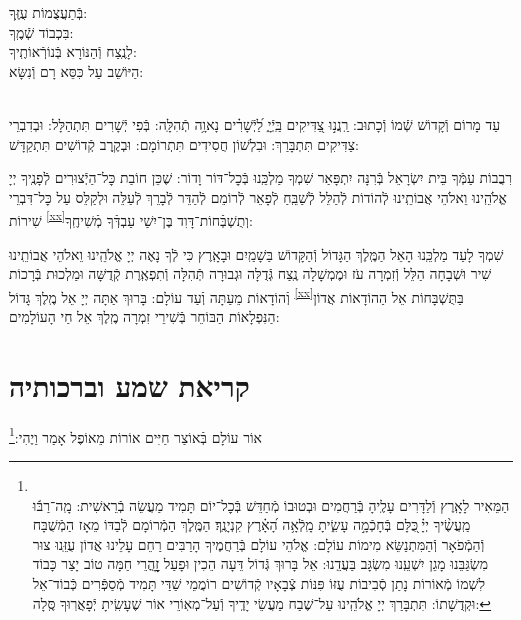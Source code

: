 \documentclass[twoside, openany, parskip=half, 11pt]{book}
\begin{document}

בְּֿתַעֲצֻמוֹת עֻזֶּֽךָ:\\
בִּכְבוֹד שְֿׁמֶֽךָ:\\
לָנֶֽצַח וְֿהַנּוֹרָא בְּֿנוֹרְֿאוֹתֶֽיךָ:\\
הַיּוֹשֵׁב עַל כִּסֵּא רָם וְֿנִשָּׂא:

\\
עַד מָרוֹם וְֿקָדוֹשׁ שְֿׁמוֹ וְֿכָתוּב: רַֽנֲנ֣וּ צַ֭דִּיקִים בַּֽיְֿיָ֑ לַ֝יְֿשָׁרִ֗ים נָאוָ֥ה תְֿהִלָּֽה: בְּֿפִי יְֿשָׁרִים תִּתְהַלָּל: וּבְדִבְרֵי צַדִּיקִים תִּתְבָּרַךְ: וּבִלְשׁוֹן חֲסִידִים תִּתְרוֹמָם: וּבְקֶֽרֶב קְֿדוֹשִׁים תִּתְקַדָּשׁ:

רִבֲבוֹת עַמְּֿךָ בֵּית יִשְׂרָאֵל בְּֿרִנָּה יִתְפָּאַר שִׁמְךָ מַלְכֵּֽנוּ בְּֿכׇל־דּוֹר וָדוֹר: שֶׁכֵּן חוֹבַת כׇּל־הַיְֿצוּרִים לְֿפָנֶֽיךָ יְיָ אֱלֹהֵֽינוּ וֵאלֹהֵי אֲבוֹתֵֽינוּ לְֿהוֹדוֹת לְֿהַלֵּל לְֿשַׁבֵּֽחַ לְֿפָאֵר לְֿרוֹמֵם לְֿהַדֵּר לְֿבָרֵךְ לְֿעַלֵּה וּלְקַלֵּס עַל כׇּל־דִּבְרֵי שִׁירוֹת \textsuperscript{\ref{xx}}וְתֻשְׁבְּֿחוֹת־דָּוִד בֶּן־יִשַׁי עַבְדְּֿךָ מְֿשִׁיחֶֽךָ:


שִׁמְךָ לָעַד מַלְכֵּֽנוּ הָאֵל הַמֶּֽלֶךְ הַגָּדוֹל וְֿהַקָּדוֹשׁ בַּשָׁמַֽיִם וּבָאָֽרֶץ כִּי לְֿךָ נָאֶה יְיָ אֱלֹהֵֽינוּ וֵאלֹהֵי אֲבוֹתֵֽינוּ שִׁיר וּשְׁבָחָה הַלֵּל וְֿזִמְרָה עֹז וּמֶמְשָׁלָה נֶֽצַח גְּֿדֻלָּה וּגְבוּרָה תְּֿהִלָּה וְֿתִפְאֶֽרֶת קְֿדֻשָּׁה וּמַלְכוּת בְּֿרָכוֹת וְֿהוֹדָאוֹת מֵעַתָּה וְֿעַד עוֹלָם:
בָּרוּךְ אַתָּה יְיָ אֵל מֶֽלֶךְ גָּדוֹל \textsuperscript{\ref{xx}}בַּתֻּשְׁבָּחוֹת אֵל הַהוֹדָאוֹת אֲדוֹן הַנִּפְלָאוֹת הַבּוֹחֵר בְּֿשִׁירֵי זִמְרָה מֶֽלֶךְ אֵל חַי הָעוֹלָמִים:

\halfkaddish

\section*{ קריאת שמע וברכותיה }

\barachu


אוֹר עוֹלָם בְּֿאוֹצַר חַיִּים אוֹרוֹת מֵאוֹפֶל אָמַר וַיֶהִי:\footnote{\\
הַמֵּאִיר לָאָֽרֶץ וְֿלַדָּרִים עָלֶֽיהָ בְּֿרַחֲמִים וּבְטוּבוֹ מְֿחַדֵּשׁ בְּֿכׇל־יוֹם תָּמִיד מַעֲשֵׂה בְֿרֵאשִׁית:
מָֽה־רַבּ֬וּ מַֽעֲשֶׂ֨יךָ יְיָ֗ ֖כֻּלָּם בְּֿחָכְֿמָ֣ה עָשִׂ֑יתָ מָֽלְֿאָ֥ה הָ֝אָ֗רֶץ קִנְיָנֶֽךָ׃ הַמֶּֽלֶךְ הַמְֿרוֹמָם לְֿבַדּוֹ מֵאָז הַמְֿשֻׁבָּח וְֿהַמְֿפֹאָר וְֿהַמִּתְנַשֵּׂא מִימוֹת עוֹלָם: אֱלֹהֵי עוֹלָם בְּֿרַחֲמֶיךָ הָרַבִּים רַחֵם עָלֵינוּ אֲדוֹן עֻזֵּֽנוּ צוּר מִשְׂגַּבֵּנוּ מָגֵן יִשְׁעֵֽנוּ מִשְׂגָּב בַּעֲדֵֽנוּ: אֵל בָּרוּךְ גְּֿדוֹל דֵּעָה הֵכִין וּפָעַל זׇׇׇׇָהֳרֵי חַמָּה טוֹב יָצַר כָּבוֹד לִשְׁמוֹ מְֿאוֹרוֹת נָתַן סְֿבִיבוֹת עֻזּוֹ פִּנּוֹת צְֿבָאָיו קְֿדוֹשִׁים רוֹמֲמֵי שַׁדַּי תָּמִיד מְֿסַפְּֿרִים כְּֿבוֹד־אֵל וּקְדֻשָׁתוֹ: תִּתְבָּרַךְ יְיָ אֱלֹהֵֽינוּ עַל־שֶׁבַח מַעֲשֵׂי יָדֶֽיךָ וְֿעַל־מְאֽוֹרֵי אוֹר שֶׁעָשִֽׂיתָ יְֿפָאֲרֽוּךָ סֶּֽלָה:
}
\end{document}
